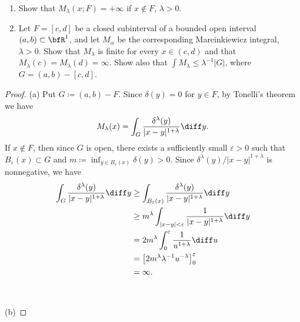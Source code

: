 \begin{problem}
\begin{enumerate}[label=(\alph*)]
\item Show that $M_\lambda(x;F)=+\infty$ if $x\notin F$, $\lambda>0$.
\item Let $F=[c,d]$ be a closed subinterval of a bounded open interval
  $(a,b)\subset\bfR^1$, and let $M_\alpha$ be the corresponding
  Marcinkiewicz integral, $\lambda>0$. Show that $M_\lambda$ is finite for
  every $x\in(c,d)$ and that $M_\lambda(c)=M_\lambda(d)=\infty$. Show also
  that $\int M_\lambda\leq\lambda^{-1}|G|$, where $G=(a,b)-[c,d]$.
\end{enumerate}
\end{problem}
\begin{proof}
(a) Put $G\coloneqq(a,b)\minus F$. Since $\delta(y)=0$ for $y\in F$, by
Tonelli's theorem we have
\begin{equation}
  \label{eq:application-of-tonelli-2}
M_\lambda(x)=\int_G\frac{\delta^\lambda(y)}{|x-y|^{1+\lambda}}\diff y.
\end{equation}
If $x\notin F$, then since $G$ is open, there exists a sufficiently small
$\varepsilon>0$ such that $B_\varepsilon(x)\subset G$ and
$m\coloneqq\inf_{y\in B_\varepsilon(x)}\delta(y)>0$. Since
$\delta^\lambda(y)/|x-y|^{1+\lambda}$ is nonnegative, we have
\begin{align*}
\int_G\frac{\delta^\lambda(y)}{|x-y|^{1+\lambda}}\diff y
&\geq
  \int_{B_\varepsilon(x)}\frac{\delta^\lambda(y)}{|x-y|^{1+\lambda}}\diff
  y\\
&\geq m^\lambda\int_{|x-y|<\varepsilon}\frac{1}{|x-y|^{1+\lambda}}\diff y\\
&=2m^\lambda\int_0^\varepsilon\frac{1}{u^{1+\lambda}}\diff u\\
&=\left[2m^\lambda\lambda^{-1}u^{-\lambda}\right]_0^\varepsilon\\
&=\infty.
\end{align*}
\\\\
(b)
\end{proof}

